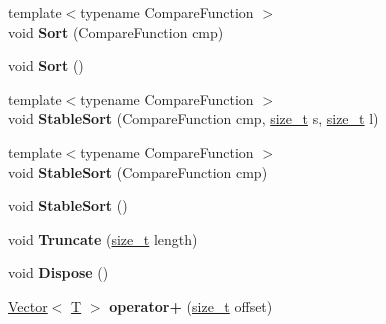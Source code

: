 \begin{DoxyCompactItemize}
\item 
\mbox{\label{classv8_1_1internal_1_1Vector_aa287135a0f6de0235a1bf8f3d425220f}} 
{\footnotesize template$<$typename Compare\+Function $>$ }\\void {\bfseries Sort} (Compare\+Function cmp)
\item 
\mbox{\label{classv8_1_1internal_1_1Vector_a1914139a503a171e777f3d0b951069aa}} 
void {\bfseries Sort} ()
\item 
\mbox{\label{classv8_1_1internal_1_1Vector_a331d883c24f767fbfb6fb9dcbf0e6942}} 
{\footnotesize template$<$typename Compare\+Function $>$ }\\void {\bfseries Stable\+Sort} (Compare\+Function cmp, \mbox{\hyperlink{classsize__t}{size\+\_\+t}} s, \mbox{\hyperlink{classsize__t}{size\+\_\+t}} l)
\item 
\mbox{\label{classv8_1_1internal_1_1Vector_aa1179492b191705790d1db684c05430f}} 
{\footnotesize template$<$typename Compare\+Function $>$ }\\void {\bfseries Stable\+Sort} (Compare\+Function cmp)
\item 
\mbox{\label{classv8_1_1internal_1_1Vector_a5fc19021882c987a5105126b094f28a4}} 
void {\bfseries Stable\+Sort} ()
\item 
\mbox{\label{classv8_1_1internal_1_1Vector_ac9d39ea562952de1e56a4900b5604051}} 
void {\bfseries Truncate} (\mbox{\hyperlink{classsize__t}{size\+\_\+t}} length)
\item 
\mbox{\label{classv8_1_1internal_1_1Vector_a29bc665bb5c8a27e328107fcd414eef2}} 
void {\bfseries Dispose} ()
\item 
\mbox{\label{classv8_1_1internal_1_1Vector_ad3aecc32d12e1dcf5b523f25ed43f959}} 
\mbox{\hyperlink{classv8_1_1internal_1_1Vector}{Vector}}$<$ \mbox{\hyperlink{classv8_1_1internal_1_1torque_1_1T}{T}} $>$ {\bfseries operator+} (\mbox{\hyperlink{classsize__t}{size\+\_\+t}} offset)
\item 
\mbox{\label{classv8_1_1internal_1_1Vector_a3456df9fc9d1cd2a46bed76414f94979}} 

\end{DoxyCompactItemize}
